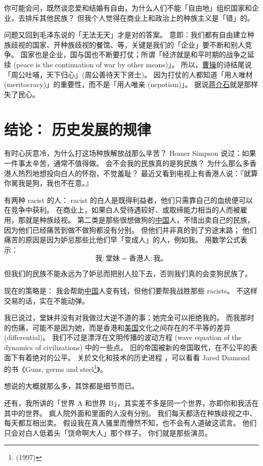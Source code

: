 \documentclass[12pt]{report}
\begin{document}
你可能会问，既然谈恋爱和结婚有自由，为什么人们不能「自由地」组织国家和企业，去排斥其他民族？ 但我个人觉得在商业上和政治上的种族主义是「错」的。

问题又回到毛泽东说的「无法无天」才是对的答案。 意即：我们都有自由建立种族歧视的国家、开种族歧视的餐馆、等，关键是我们的「企业」要不断和别人竞争。 国家也是企业，国与国也不断要打仗；所谓「经济就是和平时期的战争之延续 (peace is the continuation of war by other means)」。 所以，\underline{曹操}的诗结尾说「周公吐哺，天下归心」(周公善待天下贤士)。 因为打仗的人都知道「用人唯材 (meritocracy)」的重要性，而不是「用人唯亲 (nepotism)」。 据说\underline{蒋介石}就是那样失了民心。

\chapter{结论： 历史发展的规律}

有时心灰意冷，为什么打这场种族解放战那么辛苦？ Homer Simpson 说过：如果一件事太辛苦，通常不值得做。 会不会我的民族真的是狗民族？ 为什么那么多香港人热烈地想投向白人的怀抱，不觉羞耻？ 最近又看到电视上有香港人说：『就算你駡我是狗，我也不在意。』

有两种 racist 的人： racist 的白人是既得利益者，他们只需靠自己的血统便可以在竞争中获利。 在商业上，如果白人受待遇较好、或取缔能力相当的人而被雇用，那就是种族歧视。 第二类是那些很想做狗的\underline{中国}人，不惜出卖自己的民族，因为他们已经痛苦到做不做狗都没有分别。 但他们并非真的到了穷途末路； 他们痛苦的原因是因为妒忌那些比他们早「变成人」的人，例如我。 用数学公式表示：
$$ \mbox{我} : \mbox{堂妹} = \mbox{香港人} : \mbox{我。} $$

但我们的民族不能永远为了妒忌而把别人拉下去，否则我们真的会变狗民族了。

现在的策略是： 我会帮助\underline{中国}人变有钱，但他们要帮我战胜那些 racists。 不这样交易的话，实在不能动弹。

我已说过，堂妹并没有对我做过大逆不道的事；她完全可以拒绝我的。 而我那时的伤痛，可能不是因为她，而是香港和\underline{美国}文化之间存在的不平等的差异 (differential)。 我们不过是漂浮在文明传播的波动方程 (wave equation of the dynamics of civilizations) 中的一些点。 旧的帝国被新的帝国取代，在不公平的表面下有着绝对的公平。 关於文化和技术的历史进程 ，可以看看 Jared Diamond 的书《Guns, germs and steel\footnote{(1997)}》。

想说的大概就那么多，其馀都是细节而已。

还有，我所讲的「世界 A 和世界 B」，其实差不多是同一个世界，亦即你和我活在其中的世界。 疯人院外面和里面的人没有分别。 我们每天都活在种族歧视之中、每天都互相出卖。 假设我在真人骚里而懵然不知，也不会有人道破这谎言。 他们只会对白人低着头「饶命啊大人」那个样子。 你们就是那些演员。
\end{document}
